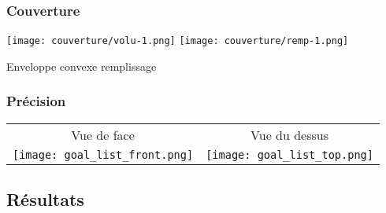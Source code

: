 \documentclass[french]{beamer}
\begin{document}
\begin{frame}
    \frametitle{Couverture}
    
    \center
    \texttt{[image: couverture/volu-1.png]}
    \texttt{[image: couverture/remp-1.png]}


    Enveloppe convexe remplissage
\end{frame}

\begin{frame}
    \frametitle{Précision}

    
    \begin{tabular}{c c}
        Vue de face & Vue du dessus
        \\
        \texttt{[image: goal\_list\_front.png]} &
        \texttt{[image: goal\_list\_top.png]}
    \end{tabular}





\end{frame}

\subsection{Résultats}
\end{document}
